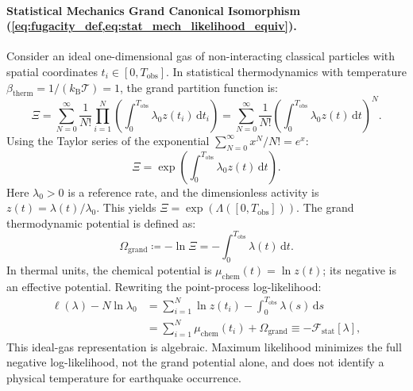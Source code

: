 \paragraph{Statistical Mechanics Grand Canonical Isomorphism
(\cref{eq:fugacity_def,eq:stat_mech_likelihood_equiv}).}
Consider an ideal one-dimensional gas of non-interacting classical
particles with
spatial coordinates $t_i \in [0, T_{\mathrm{obs}}]$. In statistical
thermodynamics
with temperature $\beta_{\mathrm{therm}} =
1/(k_{\mathrm{B}}\mathcal{T}) = 1$, the
grand partition function is:
\begin{equation}
  \Xi = \sum_{N=0}^\infty \frac{1}{N!} \prod_{i=1}^N \left(
  \int_0^{T_{\mathrm{obs}}} \lambda_0 z(t_i)\,\mathrm{d}t_i \right)
  = \sum_{N=0}^\infty \frac{1}{N!} \left( \int_0^{T_{\mathrm{obs}}}
  \lambda_0 z(t)\,\mathrm{d}t \right)^{\!N}.
\end{equation}
Using the Taylor series of the exponential $\sum_{N=0}^\infty x^N / N! = e^x$:
\begin{equation}
  \Xi = \exp\left( \int_0^{T_{\mathrm{obs}}} \lambda_0
  z(t)\,\mathrm{d}t \right).
  \label{eq:supp_grand_partition_eval}
\end{equation}
Here $\lambda_0>0$ is a reference rate, and the dimensionless activity
is $z(t)=\lambda(t)/\lambda_0$. This yields $\Xi =
\exp(\Lambda([0, T_{\mathrm{obs}}]))$.
The grand thermodynamic potential is defined as:
\begin{equation}
  \Omega_{\mathrm{grand}} \coloneqq -\ln \Xi =
  -\int_0^{T_{\mathrm{obs}}} \lambda(t)\,\mathrm{d}t.
\end{equation}
In thermal units, the chemical potential is
$\mu_{\mathrm{chem}}(t)=\ln z(t)$; its negative is an effective potential.
Rewriting the point-process log-likelihood:
\begin{equation}
  \begin{aligned}
    \ell(\lambda)-N\ln\lambda_0 &= \sum_{i=1}^N \ln z(t_i) -
    \int_0^{T_{\mathrm{obs}}} \lambda(s)\,\mathrm{d}s \\
    &= \sum_{i=1}^N \mu_{\mathrm{chem}}(t_i) +
    \Omega_{\mathrm{grand}} \equiv -\mathcal{F}_{\mathrm{stat}}[\lambda],
  \end{aligned}
\end{equation}
This ideal-gas representation is algebraic. Maximum likelihood minimizes
the full negative log-likelihood, not the grand potential alone, and does
not identify a physical temperature for earthquake occurrence.

